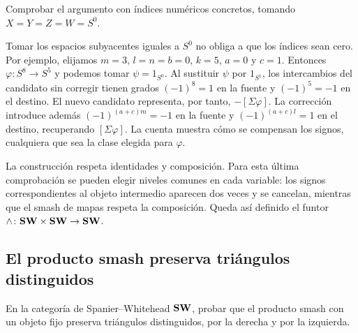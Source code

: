 \begin{ejer}
Comprobar el argumento con índices numéricos concretos, tomando $X=Y=Z=W=S^0$.
\end{ejer}
\begin{sol}
Tomar los espacios subyacentes iguales a $S^0$ no obliga a que los índices sean cero. Por ejemplo, elijamos $m=3$, $l=n=b=0$, $k=5$, $a=0$ y $c=1$. Entonces $\varphi\colon S^8\to S^5$ y podemos tomar $\psi=1_{S^0}$. Al sustituir $\psi$ por $1_{S^1}$, los intercambios del candidato sin corregir tienen grados $(-1)^8=1$ en la fuente y $(-1)^5=-1$ en el destino. El nuevo candidato representa, por tanto, $-[\Sigma\varphi]$. La corrección introduce además $(-1)^{(a+c)m}=-1$ en la fuente y $(-1)^{(a+c)l}=1$ en el destino, recuperando $[\Sigma\varphi]$. La cuenta muestra cómo se compensan los signos, cualquiera que sea la clase elegida para $\varphi$.
\end{sol}

La construcción respeta identidades y composición. Para esta última comprobación se pueden elegir niveles comunes en cada variable: los signos correspondientes al objeto intermedio aparecen dos veces y se cancelan, mientras que el smash de mapas respeta la composición. Queda así definido el funtor $\wedge\colon\mathbf{SW}\times\mathbf{SW}\to\mathbf{SW}$.

\subsection{El producto smash preserva triángulos distinguidos}

\begin{ejer}
En la categoría de Spanier--Whitehead $\mathbf{SW}$, probar que el producto smash con un objeto fijo preserva triángulos distinguidos, por la derecha y por la izquierda.
\end{ejer}

